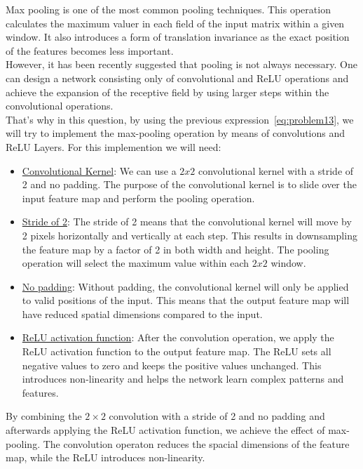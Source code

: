 Max pooling is one of the most common pooling techniques. This operation calculates the maximum valuer in each field of the input matrix within a given window. It also introduces a form of translation invariance as the exact position of the features becomes less important.\\

However, it has been recently suggested that pooling is not always necessary. One can design a network consisting only of convolutional and ReLU operations and achieve the expansion of the receptive field by using larger steps within the convolutional operations. \\

That's why in this question, by using the previous expression~\ref{eq:problem13}, we will try to implement the max-pooling operation by means of convolutions and ReLU Layers.
For this implemention we will need:
\begin{itemize}
	\item \underline{Convolutional Kernel}: We can use a $2 x 2$ convolutional kernel with a stride of 2 and no padding. The purpose of the convolutional kernel is to slide over the input feature map and perform the pooling operation.
	\item \underline{Stride of 2}: The stride of 2 means that the convolutional kernel will move by 2 pixels horizontally and vertically at each step. This results in downsampling the feature map by a factor of 2 in both width and height. The pooling operation will select the maximum value within each $2x2$ window.
	\item \underline{No padding}: Without padding, the convolutional kernel will only be applied to valid positions of the input. This means that the output feature map will have reduced spatial dimensions compared to the input.
	\item \underline{ReLU activation function}: After the convolution operation, we apply the ReLU activation function to the output feature map. The ReLU sets all negative values to zero and keeps the positive values unchanged. This introduces non-linearity and helps the network learn complex patterns and features.
\end{itemize}
\vspace{2mm}

By combining the $2 \times 2$ convolution with a stride of 2 and no padding and afterwards applying the ReLU activation function, we achieve the effect of max-pooling. The convolution operaton reduces the spacial dimensions of the feature map, while the ReLU introduces non-linearity.\\

